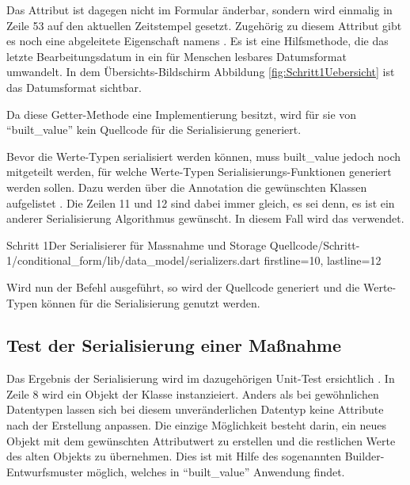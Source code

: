 Das Attribut  ist dagegen nicht im Formular änderbar, sondern wird einmalig in Zeile 53 auf den aktuellen Zeitstempel gesetzt.
Zugehörig zu diesem Attribut gibt es noch eine abgeleitete Eigenschaft namens  .  Es ist eine Hilfsmethode, die das letzte Bearbeitungsdatum in ein für Menschen lesbares Datumsformat umwandelt. In dem Übersichts-Bildschirm Abbildung \ref{fig:Schritt1Uebersicht} ist das Datumsformat sichtbar.

Da diese Getter-Methode eine Implementierung besitzt, wird für sie von \enquote{built_value} kein Quellcode für die Serialisierung generiert.

Bevor die Werte-Typen serialisiert werden können, muss built_value jedoch noch mitgeteilt werden, für welche Werte-Typen Serialisierungs-Funktionen generiert werden sollen.
Dazu werden über die Annotation  die gewünschten Klassen aufgelistet .
Die Zeilen 11 und 12 sind dabei immer gleich, es sei denn, es ist ein anderer Serialisierung Algorithmus gewünscht.
In diesem Fall wird das verwendet.

\begin{alexlisting}{Schritt 1}{Der Serialisierer für Massnahme und Storage}
  {Quellcode/Schritt-1/conditional_form/lib/data_model/serializers.dart}
  {firstline=10, lastline=12}
  \label{lst:Schritt1Serialisierer}
\end{alexlisting}


Wird nun der Befehl   ausgeführt, so wird der Quellcode generiert und die Werte-Typen können für die Serialisierung genutzt werden.

\subsection{Test der Serialisierung einer Maßnahme}

Das Ergebnis der Serialisierung wird im dazugehörigen Unit-Test ersichtlich \Lst{\ref{lst:SerialisierungEinerMassnahmeUnittest}}.
In Zeile 8 wird ein Objekt der Klasse  instanzieiert.
Anders als bei gewöhnlichen Datentypen lassen sich bei diesem unveränderlichen Datentyp keine Attribute nach der Erstellung anpassen.
Die einzige Möglichkeit besteht darin, ein neues Objekt  mit dem gewünschten Attributwert zu erstellen und die restlichen Werte des alten Objekts zu übernehmen.
Dies ist mit Hilfe des sogenannten Builder-Entwurfsmuster möglich, welches in \enquote{built_value} Anwendung findet.

